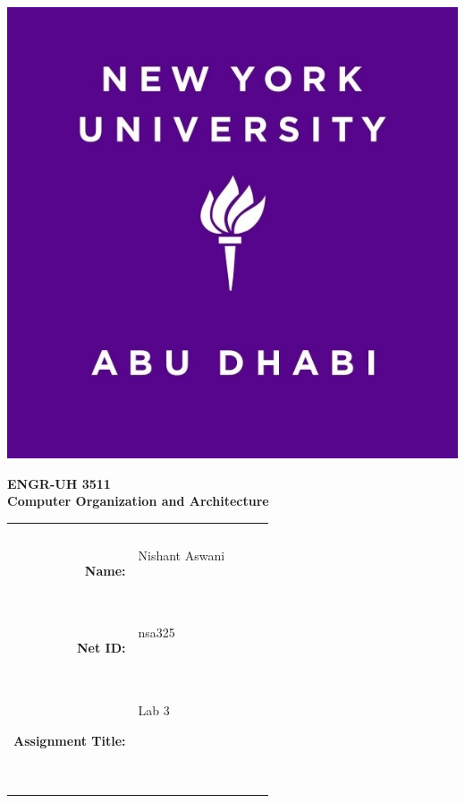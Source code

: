 \documentclass[twocolumn]{article}
\title{\myassignmenttitle}
\author{\myname, \myemail}
\affil{\myclassname (\mycoursenumber), Instructor \myinstructor}
\date{}
\newcommand{\myname}{Nishant Aswani}
\newcommand{\mynetid}{nsa325}
\newcommand{\myhwtype}{Lab }
\newcommand{\myhwnum}{3}
\newcommand{\mycoursenumber}{ENGR-UH 3511}
\newcommand{\myclassname}{Computer Organization and Architecture}
\begin{document}
\onecolumn
\pagestyle{fancy}
\fancyhf{}
\renewcommand{\headrulewidth}{0pt}

\begin{center}
  \includegraphics[scale=0.15]{etc/NYUAD-alt-logo.jpg}
\end{center}

{\vspace{2.5em}}

\begin{center}
    \Huge{\textbf{\mycoursenumber}}\\
    {\vspace{0.5em}}
    \Huge{\textbf{\myclassname}}
\end{center}

{\vspace{10em}}

\begin{center}
  \begin{tabular}{|rp{5.0cm}lll|}
    \hline
    &  &  &  & \\
    &  &  &  & \\
    \Large{\textbf{Name:}} & \Large{\myname}
    
    \  &  &  & \\
    \Large{\textbf{Net ID:}} & \Large{\mynetid}
    
    \  &  &  & \\
    \Large{\textbf{Assignment Title:}} & \Large{\myhwtype \myhwnum}
    
    \
    
    \  &  &  & \\
    \hline
  \end{tabular}
\end{center}
\end{document}
